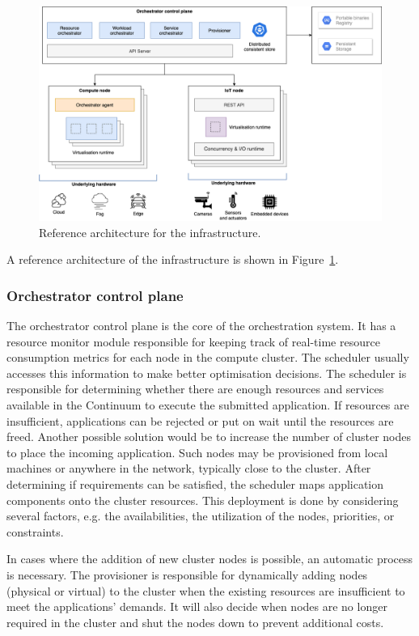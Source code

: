 \begin{figure}[ht]
\centering
\includegraphics[width=\columnwidth]{figures/architecture-broad}
\caption{Reference architecture for the infrastructure.}
\label{fig:architecture-broad}
\end{figure}

A reference architecture of the infrastructure is shown in Figure~\ref{fig:architecture-broad}.

\subsubsection{Orchestrator control plane}

The orchestrator control plane is the core of the orchestration system. It has a resource monitor module responsible for keeping track of real-time resource consumption metrics for each node in the compute cluster. The scheduler usually accesses this information to make better optimisation decisions. The scheduler is responsible for determining whether there are enough resources and services available in the Continuum to execute the submitted application. If resources are insufficient, applications can be rejected or put on wait until the resources are freed. Another possible solution would be to increase the number of cluster nodes to place the incoming application. Such nodes may be provisioned from local machines or anywhere in the network, typically close to the cluster. After determining if requirements can be satisfied, the scheduler maps application components onto the cluster resources. This deployment is done by considering several factors, e.g. the availabilities, the utilization of the nodes, priorities, or constraints.

In cases where the addition of new cluster nodes is possible, an automatic process is necessary. The provisioner is responsible for dynamically adding nodes (physical or virtual) to the cluster when the existing resources are insufficient to meet the applications' demands. It will also decide when nodes are no longer required in the cluster and shut the nodes down to prevent additional costs.

